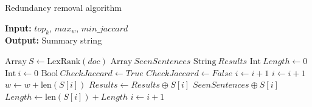 \begin{algorithm}[ht]
\caption{Redundancy removal algorithm}
\small
\hspace*{\algorithmicindent} \textbf{Input:} $top_k$, $max_w$, $min\_jaccard$\\
\hspace*{\algorithmicindent} \textbf{Output:} Summary string
\begin{algorithmic}[1]
\State $\mathrm{Array} \ S \gets \mathrm{LexRank} (doc)$
\State $\mathrm{Array} \ SeenSentences$
\State $\mathrm{String} \ Results$
\State $\mathrm{Int} \ Length \gets 0$
\State $\mathrm{Int} \ i \gets 0$
    \State $\mathrm{Bool} \ CheckJaccard \gets True$
    \State $CheckJaccard \gets False$ 
    \EndIf
    \EndFor
        \State $i \gets i+1$
        \State $i \gets i+1$
    \Else
        \State $w \gets w + \mathrm{len} (S[i])$
        \State $Results \gets Results \oplus S[i]$
        \State $SeenSentences \oplus S[i]$
        \State $Length \gets \mathrm{len}(S[i]) + Length$
        \State $i \gets i+1$
    \EndIf
\EndWhile 
\end{algorithmic} \label{alg:redundancy}
\end{algorithm} 
\normalsize